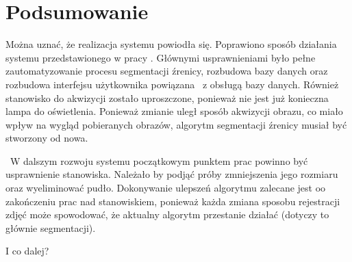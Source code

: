 \chapter{Podsumowanie}
\label{cha:podsumowanie}

Można uznać, że realizacja systemu powiodła się. Poprawiono sposób działania systemu przedstawionego w pracy \cite{Gl11}. Głównymi usprawnieniami było pełne zautomatyzowanie procesu segmentacji źrenicy, rozbudowa bazy danych oraz rozbudowa interfejsu użytkownika powiązana ~z obsługą bazy danych. Również stanowisko do akwizycji zostało uproszczone, ponieważ nie jest już konieczna lampa do oświetlenia. Ponieważ zmianie uległ sposób akwizycji obrazu, co miało wpływ na wygląd pobieranych obrazów, algorytm segmentacji źrenicy musiał być stworzony od nowa.

~W dalszym rozwoju systemu początkowym punktem prac powinno być usprawnienie stanowiska. Należało by podjąć próby zmniejszenia jego rozmiaru oraz wyeliminować pudło. Dokonywanie ulepszeń algorytmu zalecane jest oo zakończeniu prac nad stanowiskiem, ponieważ każda zmiana sposobu rejestracji zdjęć może spowodować, że aktualny algorytm przestanie działać (dotyczy to głównie segmentacji).

I co dalej?

